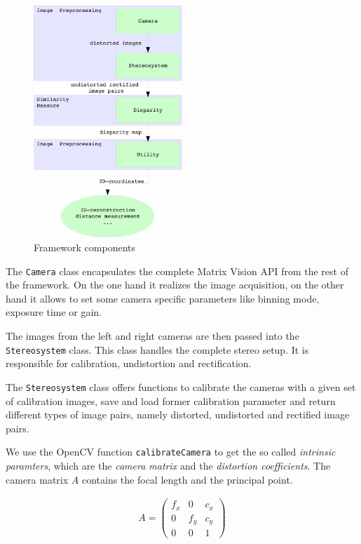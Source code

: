 \documentclass[11pt]{article}
\begin{document}
\begin{figure}[H]
        \centering
        \includegraphics[width=0.5\textwidth]{images/graph_composition}
        \caption{Framework components}
        \label{fig:framework}
\end{figure}

The \texttt{Camera} class encapsulates the complete Matrix Vision API from the rest of the framework. On the one hand it realizes the image acquisition, on the other hand it allows to set some camera specific parameters like binning mode, exposure time or gain.

The images from the left and right cameras are then passed into the \texttt{Stereosystem} class. This class handles the complete stereo setup. It is responsible for calibration, undistortion and rectification. 

The \texttt{Stereosystem} class offers functions to calibrate the cameras with a given set of calibration images, save and load former calibration parameter and return different types of image pairs, namely distorted, undistorted and rectified image pairs.

We use the OpenCV function \texttt{calibrateCamera} to get the so called  \emph{intrinsic paramters}, which are the \emph{camera matrix} and the \emph{distortion coefficients}. The camera matrix $A$ contains the focal length and the principal point. 

\begin{align*}
A=
\begin{pmatrix}
f_x & 0 & c_x\\
0 & f_y & c_y\\
0 & 0 & 1
\end{pmatrix}
\end{align*}
\end{document}
